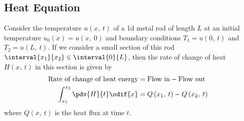 \documentclass{article}
\begin{document}
\subsection{Heat Equation}
Consider the temperature \(u\left( x,\: t \right)\) of a 1d metal rod of length \(L\) at an initial temperature \(u_0\left( x \right) = u\left( x,\: 0 \right)\) and boundary conditions \(T_1 = u\left( 0,\: t \right)\) and \(T_2 = u\left( L,\: t \right)\).
If we consider a small section of this rod \(\interval{x_1}{x_2} \in \interval{0}{L}\), then the rate of change of heat \(H\left( x,\: t \right)\) in this section is given by
\begin{align*}
    \text{Rate of change of heat energy} & = \text{Flow in} - \text{Flow out}                    \\
    \int_{x_1}^{x_2} \pdv{H}{t} \odif{x} & = Q\left( x_1,\: t \right) - Q\left( x_2,\: t \right)
\end{align*}
where \(Q\left( x,\: t \right)\) is the heat flux at time \(t\).
\end{document}
